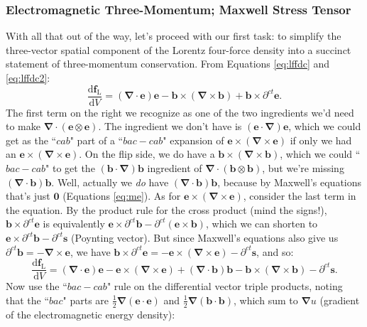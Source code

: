 \documentclass[12pt]{article}
\renewcommand{\vv}[1]{\mathbf{#1}}
\newcommand{\dd}[1]{\mathrm{d}#1}
\newcommand{\del}{\boldsymbol{\nabla}}
\begin{document}
\subsubsection{Electromagnetic Three-Momentum; Maxwell Stress Tensor}

With all that out of the way, let's proceed with our first task: to simplify the three-vector spatial component of the Lorentz four-force density into a succinct statement of three-momentum conservation. From Equations \ref{eq:lffdc} and \ref{eq:lffdc2}:
\begin{equation*}
\dfrac{\dd \vv f_{\mathrm{L}}}{\dd V} = \left( \del \cdot \vv e \right) \vv e - \vv b \times \left( \del \times \vv b \right) + \vv b \times \partial^{ct} \vv e .
\end{equation*}
The first term on the right we recognize as one of the two ingredients we'd need to make $\del \cdot (\vv e \otimes \vv e)$. The ingredient we don't have is $(\vv e \cdot \del) \vv e$, which we could get as the ``$cab$" part of a ``$bac - cab$" expansion of $\vv e \times (\del \times \vv e)$ if only we had an $\vv e \times (\del \times \vv e)$. On the flip side, we do have a $\vv b \times (\del \times \vv b)$, which we could ``$bac - cab$" to get the $(\vv b \cdot \del) \vv b$ ingredient of $\del \cdot (\vv b \otimes \vv b)$, but we're missing $(\del \cdot \vv b) \vv b$. Well, actually we \emph{do} have $(\del \cdot \vv b) \vv b$, because by Maxwell's equations that's just $\vv 0$ (Equations \ref{eq:me}). As for $\vv e \times (\del \times \vv e)$, consider the last term in the equation. By the product rule for the cross product (mind the signs!), $\vv b \times \partial^{ct} \vv e$ is equivalently $\vv e \times \partial^{ct} \vv b - \partial^{ct} \left( \vv e \times \vv b \right)$, which we can shorten to $\vv e \times \partial^{ct} \vv b - \partial^{ct} \vv s$ (Poynting vector). But since Maxwell's equations also give us $\partial^{ct} \vv b = - \del \times \vv e$, we have $\vv b \times \partial^{ct} \vv e = - \vv e \times (\del \times \vv e) - \partial^{ct} \vv s$, and so:
\begin{equation*}
\dfrac{\dd \vv f_{\mathrm{L}}}{\dd V} = \left( \del \cdot \vv e \right) \vv e - \vv e \times (\del \times \vv e) + (\del \cdot \vv b) \vv b - \vv b \times \left( \del \times \vv b \right) - \partial^{ct} \vv s .
\end{equation*}
Now use the ``$bac - cab$" rule on the differential vector triple products, noting that the ``$bac$" parts are $\frac{1}{2} \del (\vv e \cdot \vv e)$ and $\frac{1}{2} \del (\vv b \cdot \vv b)$, which sum to $\del u$ (gradient of the electromagnetic energy density):
\end{document}
